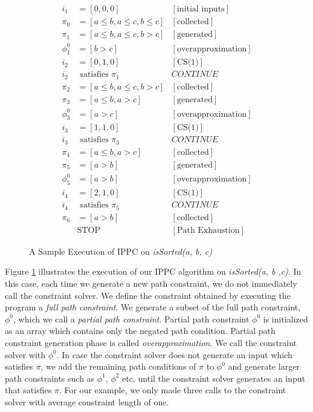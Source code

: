 \documentclass[EPiCempty]{easychair}
\begin{document}
\begin{figure}[!t]
\begin{align*}
	i_1 & = [0, 0, 0] & [\text{initial inputs}] \\
	\pi_0 & = [a \leq b, a \leq c, b \leq c] & [\text{collected}] \\
	\pi_1 & = [a \leq b, a \leq c, b > c] & [\text{generated}] \\
	\phi_1^0 & = [b > c] & [\text{overapproximation}] \\
	i_{2} & = [0, 1, 0] & [\text{CS(1)}] \\
	i_{2} & \text{~satisfies~} \pi_1 & CONTINUE \\
	\pi_2 & = [a \leq b, a \leq c, b > c] & [\text{collected}] \\
	\pi_3 & = [a \leq b, a > c] & [\text{generated}]\\
	\phi_3^0 & = [a > c] & [\text{overapproximation}] \\
	i_{3} & = [1, 1, 0] & [\text{CS(1)}] \\
	i_{3} & \text{~satisfies~} \pi_3 & CONTINUE \\
	\pi_4 & = [a \leq b, a > c] & [\text{collected}] \\
	\pi_5 & = [a > b] & [\text{generated}] \\
	\phi_5^0 & = [a > b] & [\text{overapproximation}] \\
	i_{4} & = [2, 1, 0] & [\text{CS(1)}] \\
	i_{4} & \text{~satisfies~} \pi_5 & CONTINUE \\
	\pi_6 & = [a > b] & [\text{collected}] \\
	& \text{STOP} & [\text{Path Exhaustion}]
\end{align*}
\caption{A Sample Execution of IPPC on \emph{isSorted(a, b, c)}}
\label{fig:ippc_concolic}
\end{figure}

Figure \ref{fig:ippc_concolic} illustrates the execution of our IPPC algorithm on \emph{isSorted(a, b ,c)}. In this case, each time we generate a new path constraint, we do not immediately call the constraint solver. We define the constraint obtained by executing the program a \emph{full path constraint}. We generate a subset of the full path constraint, $\phi^0$, which we call a \emph{partial path constraint}. Partial path constraint $\phi^0$ is initialized as an array which contains only the negated path condition. Partial path constraint generation phase is called \emph{overapproximation}. We call the constraint solver with $\phi^0$. In case  the constraint solver does not generate an input which satisfies $\pi$, we add the remaining path conditions of $\pi$ to $\phi^0$ and generate larger path constraints such as $\phi^1$, $\phi^2$ etc. until the constraint solver generates an input that satisfies $\pi$. For our example, we only made three calls to the constraint solver with average constraint length of one.
\end{document}
